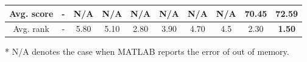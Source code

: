 \begin{table*}[]
{\begin{threeparttable}
\begin{tabular}{@{}c||c||ccccccc|c@{}}
        \midrule
        \midrule
        Avg. score       & \multicolumn{1}{c}{-} & N/A                & N/A                 & N/A                         & N/A                 & N/A                 & N/A                 & 70.45                       & \textbf{72.5}9              \\
        \midrule
        \midrule
        Avg. rank        & \multicolumn{1}{c}{-} & 5.80               & 5.10                & 2.80                        & 3.90                & 4.70                & 4.5                 & 2.30                        & \textbf{1.50}               \\
        \bottomrule
      \end{tabular}\begin{tablenotes}
        \item[*] N/A denotes the case when MATLAB reports the error of out of memory.
      \end{tablenotes}
    \end{threeparttable}
  }

\end{table*}



